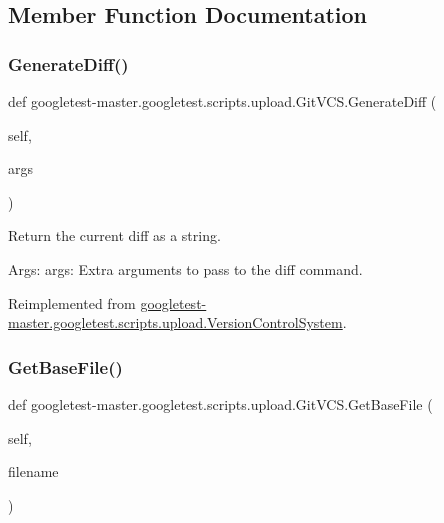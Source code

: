 \subsection{Member Function Documentation}
\mbox{\label{classgoogletest-master_1_1googletest_1_1scripts_1_1upload_1_1_git_v_c_s_a588378267f59aca16c80074bfcb51630}} 
\subsubsection{\texorpdfstring{GenerateDiff()}{GenerateDiff()}}
{\footnotesize\ttfamily def googletest-\/master.\+googletest.\+scripts.\+upload.\+Git\+V\+C\+S.\+Generate\+Diff (\begin{DoxyParamCaption}\item[{}]{self,  }\item[{}]{args }\end{DoxyParamCaption})}

\begin{DoxyVerb}Return the current diff as a string.

Args:
  args: Extra arguments to pass to the diff command.
\end{DoxyVerb}
 

Reimplemented from \mbox{\hyperlink{classgoogletest-master_1_1googletest_1_1scripts_1_1upload_1_1_version_control_system_a655beae832bab0a437542ee635477485}{googletest-\/master.\+googletest.\+scripts.\+upload.\+Version\+Control\+System}}.

\mbox{\label{classgoogletest-master_1_1googletest_1_1scripts_1_1upload_1_1_git_v_c_s_ae7a966e140897643c1af0b6d946cbb68}} 
\subsubsection{\texorpdfstring{GetBaseFile()}{GetBaseFile()}}
{\footnotesize\ttfamily def googletest-\/master.\+googletest.\+scripts.\+upload.\+Git\+V\+C\+S.\+Get\+Base\+File (\begin{DoxyParamCaption}\item[{}]{self,  }\item[{}]{filename }\end{DoxyParamCaption})}

